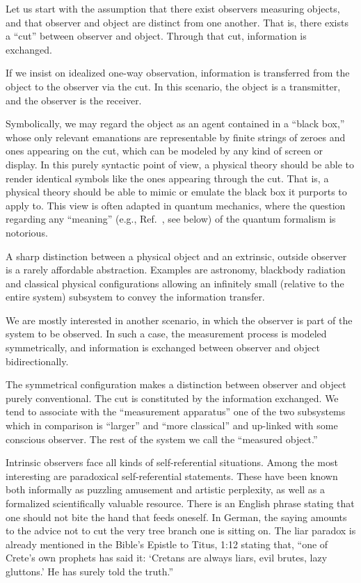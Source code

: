 \documentclass[rmp,amsfonts,showpacs,showkeys,twocolumn]{revtex4}
\begin{document}
Let us start with the assumption that there exist observers measuring objects, and that
observer and object are distinct from one another.
That is, there exists a ``cut'' between observer and object.
Through that cut, information is exchanged.

If we insist on idealized one-way observation,
information is transferred from the object to the observer via the cut.
In this scenario, the object is a transmitter,
and the observer is the receiver.

Symbolically, we may regard the object as an agent contained in a ``black box,''
whose only relevant emanations are representable by finite strings of zeroes and ones
appearing on the cut, which can be modeled by any kind of screen or display.
In this purely syntactic point of view,
a physical theory should be able to render identical symbols like the ones appearing through the cut.
That is, a physical theory should be able to mimic or emulate the black box it purports to apply to.
This view is often adapted in quantum mechanics,
where the question regarding any ``meaning'' (e.g., Ref.~\cite[p. 129]{feynman-law}, see below) of the quantum formalism is notorious.


A sharp distinction between a physical object and an extrinsic,
outside observer is a rarely affordable abstraction.
Examples are astronomy, blackbody radiation and classical physical configurations
allowing an infinitely small (relative to the entire system) subsystem to convey the information transfer.

We are mostly interested in another scenario, in which the observer is part of the system to be observed.
In such a case,
the measurement process is modeled symmetrically,
and information is exchanged between observer and object bidirectionally.

The symmetrical configuration makes a distinction between observer and object purely conventional.
The cut is constituted by the information exchanged.
We tend to associate with the ``measurement apparatus''
one of the two subsystems which in comparison is ``larger'' and ``more classical''
and up-linked with some conscious observer.
The rest of the system we call the ``measured object.''


Intrinsic observers face all kinds of self-referential situations.
Among the most interesting are paradoxical self-referential statements.
These have been known
both informally as puzzling amusement and artistic perplexity,
as well as a formalized scientifically valuable resource.
There is an English phrase stating that one should not bite the hand that feeds oneself.
In German, the saying amounts to the advice not to cut the very tree branch one is sitting on.
The liar paradox is already mentioned in the Bible's Epistle to Titus, 1:12 stating that,
``one of Crete's own prophets has said it: `Cretans are always liars, evil brutes, lazy gluttons.'
He has surely told the truth.''
\end{document}
